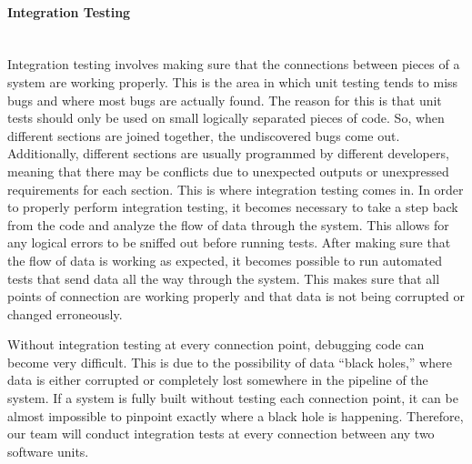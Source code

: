 \paragraph{Integration Testing} \mbox{}\\[\paragraphheaderspace]
Integration testing involves making sure that the connections between pieces of a system are working properly. This is the area in which unit testing tends to miss bugs and where most bugs are actually found. The reason for this is that unit tests should only be used on small logically separated pieces of code. So, when different sections are joined together, the undiscovered bugs come out. Additionally, different sections are usually programmed by different developers, meaning that there may be conflicts due to unexpected outputs or unexpressed requirements for each section. This is where integration testing comes in. In order to properly perform integration testing, it becomes necessary to take a step back from the code and analyze the flow of data through the system. This allows for any logical errors to be sniffed out before running tests. After making sure that the flow of data is working as expected, it becomes possible to run automated tests that send data all the way through the system. This makes sure that all points of connection are working properly and that data is not being corrupted or changed erroneously.\par
Without integration testing at every connection point, debugging code can become very difficult. This is due to the possibility of data ``black holes,'' where data is either corrupted or completely lost somewhere in the pipeline of the system. If a system is fully built without testing each connection point, it can be almost impossible to pinpoint exactly where a black hole is happening. Therefore, our team will conduct integration tests at every connection between any two software units.


